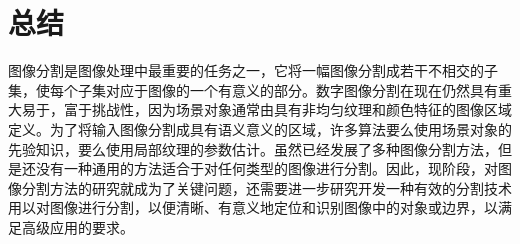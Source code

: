 \documentclass[conference]{IEEEtran}
\begin{document}




\section{总结}
图像分割是图像处理中最重要的任务之一，它将一幅图像分割成若干不相交的子集，使每个子集对应于图像的一个有意义的部分。数字图像分割在现在仍然具有重大易于，富于挑战性，因为场景对象通常由具有非均匀纹理和颜色特征的图像区域定义。为了将输入图像分割成具有语义意义的区域，许多算法要么使用场景对象的先验知识，要么使用局部纹理的参数估计。虽然已经发展了多种图像分割方法，但是还没有一种通用的方法适合于对任何类型的图像进行分割。因此，现阶段，对图像分割方法的研究就成为了关键问题，还需要进一步研究开发一种有效的分割技术用以对图像进行分割，以便清晰、有意义地定位和识别图像中的对象或边界，以满足高级应用的要求。




\end{document}
